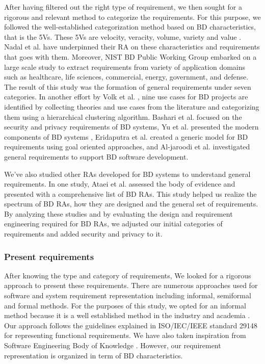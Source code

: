 \documentclass{bmcart}
\begin{document}
After having filtered out the right type of requirement, we then sought for a rigorous and relevant method to categorize the requirements. For this purpose, we followed the well-established categorization method based on BD characteristics, that is the 5Vs. These 5Vs are velocity, veracity, volume, variety and value \cite{Bughin2016, rad2017big}. Nadal et al. \cite{nadal2017software} have underpinned their RA on these characteristics and requirements that goes with them. Moreover, NIST BD Public Working Group embarked on a large scale study to extract requirements from variety of application domains such as healthcare, life sciences, commercial, energy, government, and defense. The result of this study was the formation of general requirements under seven categories. In another effort by Volk et al. \cite{volk2020identifying}, nine use cases for BD projects are identified by collecting theories and use cases from the literature and categorizing them using a hierarchical clustering algorithm. Bashari et al. \cite{bashari2016security} focused on the security and privacy requirements of BD systems, Yu et al. presented the modern components of BD systems \cite{yu2019components}, Eridaputra et al. \cite{eridaputra2014modeling} created a generic model for BD requirements using goal oriented approaches, and Al-jaroodi et al. \cite{al2016characteristics} investigated general requirements to support BD software development. 

We've also studied other RAs developed for BD systems to understand general requirements. In one study, Ataei et al. \cite{ataei2020big} assessed the body of evidence and presented with a comprehensive list of BD RAs. This study helped us realize the spectrum of BD RAs, how they are designed and the general set of requirements. By analyzing these studies and by evaluating the design and requirement engineering required for BD RAs, we adjusted our initial categories of requirements and added security and privacy to it.

\subsubsection{Present requirements}
After knowing the type and category of requirements, We looked for a rigorous approach to present these requirements. There are numerous approaches used for software and system requirement representation including informal, semiformal and formal methods. For the purposes of this study, we opted for an informal method because it is a well established method in the industry and academia \cite{kassab2014state}. Our approach follows the guidelines explained in ISO/IEC/IEEE standard 29148 \cite{ISO29148} for representing functional requirements. We have also taken inspiration from Software Engineering Body of Knowledge \cite{abran2004software}. However, our requirement representation is organized in term of BD characteristics. 
\end{document}
